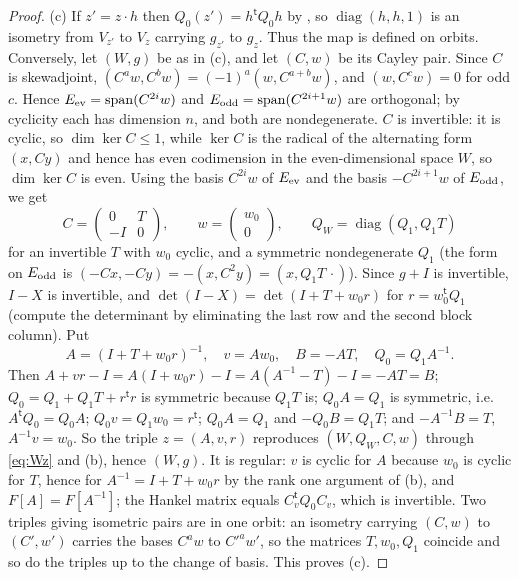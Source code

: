 \documentclass[11pt,oneside,notitlepage]{book}
\numberwithin{equation}{section}
\theoremstyle{plain}
\theoremstyle{definition}
\newcommand{\diag}{\operatorname{diag}}
\begin{document}
\begin{proof}
(c) If $z'=z\cdot h$ then $Q_0(z')=h^{\mathsf t}Q_0h$ by , so $\diag(h,h,1)$ is an isometry from $V_{z'}$ to $V_z$ carrying $g_{z'}$ to $g_z$. Thus the map is defined on orbits. Conversely, let $(W,g)$ be as in (c), and let $(C,w)$ be its Cayley pair. Since $C$ is skewadjoint, $(C^aw,C^bw)=(-1)^a(w,C^{a+b}w)$, and $(w,C^{c}w)=0$ for odd $c$. Hence $E_{\rm ev}=\mathrm{span}(C^{2i}w)$ and $E_{\rm odd}=\mathrm{span}(C^{2i+1}w)$ are orthogonal; by cyclicity each has dimension $n$, and both are nondegenerate. $C$ is invertible: it is cyclic, so $\dim\ker C\le1$, while $\ker C$ is the radical of the alternating form $(x,Cy)$ and hence has even codimension in the even-dimensional space $W$, so $\dim\ker C$ is even. Using the basis $C^{2i}w$ of $E_{\rm ev}$ and the basis $-C^{2i+1}w$ of $E_{\rm odd}$, we get
\[C=\begin{pmatrix}0&T\\-I&0\end{pmatrix},\qquad w=\begin{pmatrix}w_0\\0\end{pmatrix},\qquad Q_W=\diag(Q_1,Q_1T)\]
for an invertible $T$ with $w_0$ cyclic, and a symmetric nondegenerate $Q_1$ (the form on $E_{\rm odd}$ is $(-Cx,-Cy)=-(x,C^2y)=(x,Q_1T\,\cdot)$). Since $g+I$ is invertible, $I-X$ is invertible, and $\det(I-X)=\det(I+T+w_0r)$ for $r=w_0^{\mathsf t}Q_1$ (compute the determinant by eliminating the last row and the second block column). Put
\[A=(I+T+w_0r)^{-1},\quad v=Aw_0,\quad B=-AT,\quad Q_0=Q_1A^{-1}.\]
Then $A+vr-I=A(I+w_0r)-I=A(A^{-1}-T)-I=-AT=B$; $Q_0=Q_1+Q_1T+r^{\mathsf t}r$ is symmetric because $Q_1T$ is; $Q_0A=Q_1$ is symmetric, i.e.\ $A^{\mathsf t}Q_0=Q_0A$; $Q_0v=Q_1w_0=r^{\mathsf t}$; $Q_0A=Q_1$ and $-Q_0B=Q_1T$; and $-A^{-1}B=T$, $A^{-1}v=w_0$. So the triple $z=(A,v,r)$ reproduces $(W,Q_W,C,w)$ through \eqref{eq:Wz} and (b), hence $(W,g)$. It is regular: $v$ is cyclic for $A$ because $w_0$ is cyclic for $T$, hence for $A^{-1}=I+T+w_0r$ by the rank one argument of (b), and $F[A]=F[A^{-1}]$; the Hankel matrix equals $C_v^{\mathsf t}Q_0C_v$, which is invertible. Two triples giving isometric pairs are in one orbit: an isometry carrying $(C,w)$ to $(C',w')$ carries the bases $C^aw$ to $C'^aw'$, so the matrices $T,w_0,Q_1$ coincide and so do the triples up to the change of basis. This proves (c).


\end{proof}
\end{document}

